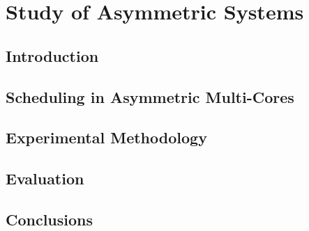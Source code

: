 \chapter{Study of Asymmetric Systems}

\section{Introduction}
\label{sec:intro}


\section{Scheduling in Asymmetric Multi-Cores}
\label{sec:scheduling}


\section{Experimental Methodology}
\label{sec:experimental}


\section{Evaluation}
\label{sec:evaluation}


\section{Conclusions}
\label{sec:conclusions}


% 
